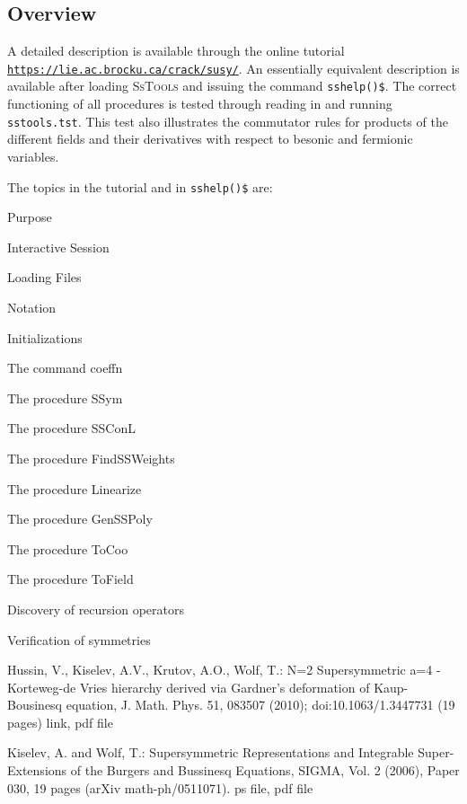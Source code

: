 \begin{cbunit}

\subsection{Overview}
A detailed description is available through the online tutorial \\
\texttt{\url{https://lie.ac.brocku.ca/crack/susy/}}. An essentially equivalent 
description is available after loading \textsc{SsTools} and issuing the command
\texttt{sshelp()\$}. The correct functioning of all procedures is tested through
reading in and running \texttt{sstools.tst}. This test also illustrates
the commutator rules for products of the different fields and their
derivatives with respect to besonic and fermionic variables.

The topics in the tutorial and in \texttt{sshelp()\$} are:
\begin{description} 
\item{Purpose}
\item{Interactive Session}
\item{Loading Files}
\item{Notation}
\item{Initializations}
\item{The command coeffn}
\item{The procedure SSym}
\item{The procedure SSConL}
\item{The procedure FindSSWeights}
\item{The procedure Linearize}
\item{The procedure GenSSPoly}
\item{The procedure ToCoo}
\item{The procedure ToField}
\item{Discovery of recursion operators}
\item{Verification of symmetries}
\end{description}


\begin{thebibliography}{99}

Hussin, V., Kiselev, A.V., Krutov, A.O., Wolf, T.: N=2 Supersymmetric a=4 -
Korteweg-de Vries hierarchy derived via Gardner's deformation of
Kaup-Bousinesq equation, J. Math. Phys. 51, 083507 (2010);
doi:10.1063/1.3447731 (19 pages) link, pdf file

Kiselev, A. and Wolf, T.: Supersymmetric Representations and Integrable
Super-Extensions of the Burgers and Bussinesq Equations, SIGMA, Vol. 2 (2006),
Paper 030, 19 pages (arXiv math-ph/0511071). ps file, pdf file


\end{thebibliography}
\end{cbunit}
